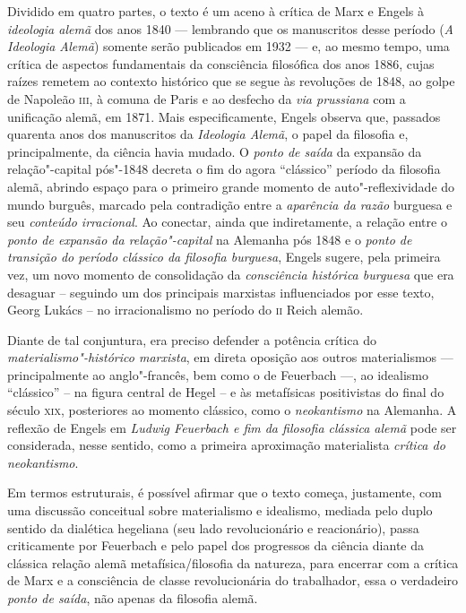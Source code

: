 Dividido em quatro partes, o texto é um aceno à
crítica de Marx e Engels à \emph{ideologia alemã} dos anos 1840 ---
lembrando que os manuscritos desse período (\emph{A Ideologia
Alemã}) somente serão publicados em 1932 --- e, ao mesmo tempo, uma crítica de aspectos
fundamentais da consciência filosófica dos anos 1886, cujas raízes remetem ao contexto histórico que se segue às
revoluções de 1848, ao golpe de Napoleão \textsc{iii}, à comuna de Paris e
ao desfecho da \emph{via prussiana} com a unificação alemã, em 1871. Mais especificamente, Engels observa que, passados quarenta anos dos manuscritos da \emph{Ideologia Alemã}, o
papel da filosofia e, principalmente, da ciência havia mudado. O
\emph{ponto de saída} da expansão da relação"-capital pós"-1848 decreta o
fim do agora ``clássico'' período da filosofia alemã, abrindo espaço para
o primeiro grande momento de auto"-reflexividade do mundo burguês, marcado pela contradição entre a 
\emph{aparência da razão} burguesa e seu \emph{conteúdo irracional}. Ao
conectar, ainda que indiretamente, a relação entre o \emph{ponto de
expansão da relação"-capital} na Alemanha pós 1848 e o \emph{ponto de
transição do período clássico da filosofia burguesa}, Engels sugere,
pela primeira vez, um novo momento de consolidação da \emph{consciência
histórica burguesa} que era desaguar -- seguindo um dos principais
marxistas influenciados por esse texto, Georg Lukács -- no irracionalismo
no período do \textsc{ii} Reich alemão.

Diante de tal conjuntura, era preciso defender a potência crítica do
\emph{materialismo"-histórico marxista}, em direta oposição aos outros
materialismos --- principalmente ao anglo"-francês, bem como o de Feuerbach ---, ao
idealismo ``clássico'' -- na figura central de Hegel -- e às metafísicas
positivistas do final do século \textsc{xix}, posteriores ao momento clássico,
como o \emph{neokantismo} na Alemanha. A reflexão de Engels em \emph{Ludwig Feuerbach e fim da filosofia clássica alemã} pode ser
considerada, nesse sentido, como a primeira aproximação materialista
\emph{crítica do neokantismo}.

Em termos estruturais, é possível afirmar que o texto começa, justamente,
com uma discussão conceitual sobre materialismo e idealismo, mediada
pelo duplo sentido da dialética hegeliana (seu lado revolucionário
e reacionário), passa criticamente por Feuerbach e pelo papel dos
progressos da ciência diante da clássica relação alemã
metafísica/filosofia da natureza, para encerrar com a crítica de Marx
e a consciência de classe revolucionária do trabalhador, essa o
verdadeiro \emph{ponto de saída}, não apenas da filosofia alemã.

